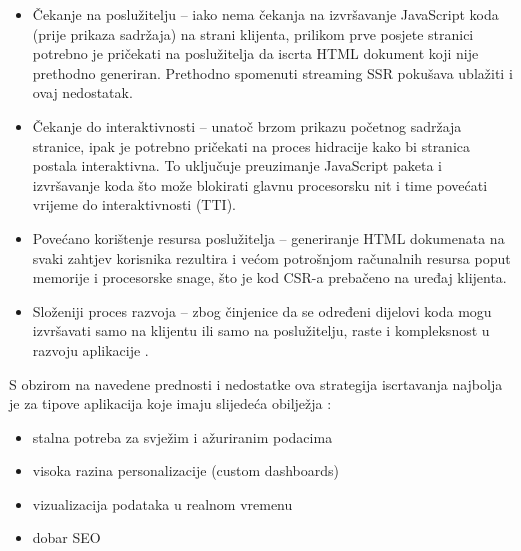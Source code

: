 \begin{itemize}
    \item Čekanje na poslužitelju – iako nema čekanja na izvršavanje JavaScript ko\-da (prije prikaza sadržaja) na strani klijenta, prilikom prve posjete stranici potrebno je pričekati na poslužitelja da iscrta HTML dokument koji nije prethodno generiran. Prethodno spomenuti streaming SSR pokušava ublažiti i ovaj nedostatak.
    \item Čekanje do interaktivnosti – unatoč brzom prikazu početnog sadržaja stranice, ipak je potrebno pričekati na proces hidracije kako bi stranica postala interaktivna. To uključuje preuzimanje JavaScript paketa i izvršavanje koda što može blokirati glavnu procesorsku nit i time povećati vrijeme do interaktivnosti (TTI).
    \item Povećano korištenje resursa poslužitelja – generiranje HTML dokumenata na svaki zahtjev korisnika rezultira i većom potrošnjom računalnih resursa poput memorije i procesorske snage, što je kod CSR-a prebačeno na uređaj klijenta.
    \item Složeniji proces razvoja – zbog činjenice da se određeni dijelovi koda mogu izvršavati samo na klijentu ili samo na poslužitelju, raste i kompleksnost u razvoju aplikacije \cite{beran2023usporedba}.
\end{itemize}

S obzirom na navedene prednosti i nedostatke ova strategija iscrtavanja najbolja je za tipove aplikacija koje imaju slijedeća obilježja \cite{moore2024rendering}:
\begin{itemize}
    \item stalna potreba za svježim i ažuriranim podacima
    \item visoka razina personalizacije (custom dashboards)
    \item vizualizacija podataka u realnom vremenu
    \item dobar SEO
\end{itemize}

